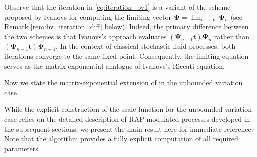 \documentclass[a4paper,11pt]{article}
\numberwithin{equation}{section}
\theoremstyle{plain}
\theoremstyle{definition}
\newcommand{\1}{\mathbf{1}}
\begin{document}
Observe that the iteration in \eqref{eq:iteration_bv1} is a variant of the scheme proposed by Ivanovs \cite[Section 4.2]{Ivanovs2021} for computing the limiting vector $\bm{\Psi} = \lim_{n \to \infty} \bm{\Psi}_n$ (see Remark \ref{rem:bv_iteration_diff} below). 
Indeed, the primary difference between the two schemes is that Ivanovs's approach evaluates $(\bm{\Psi}_{n-1}\bm{t})\bm{\Psi}_{n}$ rather than $(\bm{\Psi}_{n-1}\bm{t})\bm{\Psi}_{n-1}$. In the context of classical stochastic fluid processes, both iterations converge to the same fixed point. Consequently, the limiting equation serves as the matrix-exponential analogue of Ivanovs's Riccati equation.

Now we state the matrix-exponential extension of \cite[Theorem 1]{Ivanovs2021} in the unbounded variation case.



While the explicit construction of the scale function for the unbounded variation case relies on the detailed description of RAP-modulated processes developed in the subsequent sections, we present the main result here for immediate reference. Note that the algorithm provides a fully explicit computation of all required parameters.
\end{document}
